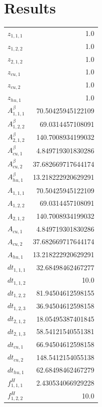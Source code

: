 \documentclass{article}%
\makeatletter
\let\mcnewpage=\newpage%
\newcommand{\TrickSupertabularIntoMulticols}{%
\renewcommand\newpage{%
\if@firstcolumn%
\hrule width\linewidth height0pt%
\columnbreak%
\else%
\mcnewpage%
\fi%
}%
}%
\makeatother
\begin{document}
\section{Results}%
\thispagestyle{plain}%
\begin{multicols*}{3}%
\TrickSupertabularIntoMulticols%
%
\begin{supertabular}{lr}%
	$z_{1,1,1}$ & 1.0 \\%
	$z_{1,2,2}$ & 1.0 \\%
	$z_{2,1,2}$ & 1.0 \\%
	$z_{cu,1}$ & 1.0 \\%
	$z_{cu,2}$ & 1.0 \\%
	$z_{hu,1}$ & 1.0 \\%
	$A_{1,1,1}^{\beta}$ & 70.50425945122109 \\%
	$A_{1,2,2}^{\beta}$ & 69.0314457108091 \\%
	$A_{2,1,2}^{\beta}$ & 140.7008934199032 \\%
	$A_{cu,1}^{\beta}$ & 4.849719301830286 \\%
	$A_{cu,2}^{\beta}$ & 37.682669717644174 \\%
	$A_{hu,1}^{\beta}$ & 13.218222920629291 \\%
	$A_{1,1,1}$ & 70.50425945122109 \\%
	$A_{1,2,2}$ & 69.0314457108091 \\%
	$A_{2,1,2}$ & 140.7008934199032 \\%
	$A_{cu,1}$ & 4.849719301830286 \\%
	$A_{cu,2}$ & 37.682669717644174 \\%
	$A_{hu,1}$ & 13.218222920629291 \\%
	$dt_{1,1,1}$ & 32.68498462467277 \\%
	$dt_{1,1,2}$ & 10.0 \\%
	$dt_{1,2,2}$ & 81.94504612598155 \\%
	$dt_{1,2,3}$ & 36.94504612598158 \\%
	$dt_{2,1,2}$ & 18.05495387401845 \\%
	$dt_{2,1,3}$ & 58.54121540551381 \\%
	$dt_{cu,1}$ & 66.94504612598158 \\%
	$dt_{cu,2}$ & 148.5412154055138 \\%
	$dt_{hu,1}$ & 62.68498462467279 \\%
	$f_{1,1,1}^{H}$ & 2.430534066929228 \\%
	$f_{1,2,2}^{H}$ & 10.0 \\%

\end{supertabular}
\end{multicols*}
\end{document}
